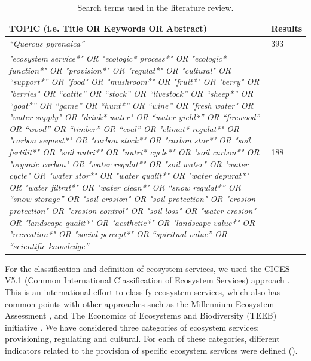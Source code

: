 \begin{table}[]
\caption{Search terms used in the literature review.}
\label{tab:es:wos}
\footnotesize
\begin{tabular}{>{\centering}p{11cm}l}
\toprule
\textbf{TOPIC (i.e. Title OR Keywords OR Abstract)} & \textbf{Results} \\ 
\toprule
\emph{“Quercus pyrenaica”} & 393 \\ \midrule
\emph{"ecosystem service*" OR "ecologic* process*" OR "ecologic*
function*" OR "provision*" OR "regulat*" OR "cultural" OR ``support*'' OR
"food" OR "mushroom*" OR "fruit*" OR "berry" OR "berries" OR
``cattle'' OR ``stock'' OR ``livestock'' OR ``sheep*'' OR ``goat*'' OR
``game'' OR ``hunt*'' OR ``wine'' OR "fresh water" OR "water supply" OR "drink* water" OR ``water
yield*'' OR ``firewood'' OR ``wood'' OR ``timber'' OR ``coal'' OR "climat* regulat*" OR "carbon sequest*" OR "carbon stock*" OR "carbon stor*" OR "soil fertilit*" OR "soil nutri*" OR "nutri* cycle*" OR "soil
carbon*" OR "organic carbon" OR "water regulat*" OR "soil water" OR "water cycle" OR "water stor*"
OR "water qualit*" OR "water depurat*" OR "water filtrat*" OR "water
clean*" OR ``snow regulat*'' OR ``snow storage'' OR "soil erosion" OR "soil protection" OR "erosion protection" OR
"erosion control" OR "soil loss" OR "water erosion" OR "landscape qualit*" OR "aesthetic*" OR "landscape value*" OR
"recreation*" OR "social percept*" OR ``spiritual value'' OR
``scientific knowledge''} & 188 \\
\bottomrule
\end{tabular}
\end{table}

For the classification and definition of ecosystem services, we used the CICES V5.1 (Common International Classification of Ecosystem Services) approach \autocites{HainesYoungPotschin2018CommonInternational}. This is an international effort to classify ecosystem services, which also has common points with other approaches such as the Millennium Ecosystem Assessment \autocite{MEA2005EcosystemsHuman}, and The Economics of Ecosystems and Biodiversity (TEEB) initiative \autocite{TEEB2010EconomicsEcosystems}. We have considered three categories of ecosystem services: provisioning, regulating and cultural. For each of these categories, different indicators related to the provision of specific ecosystem services were defined (). 

